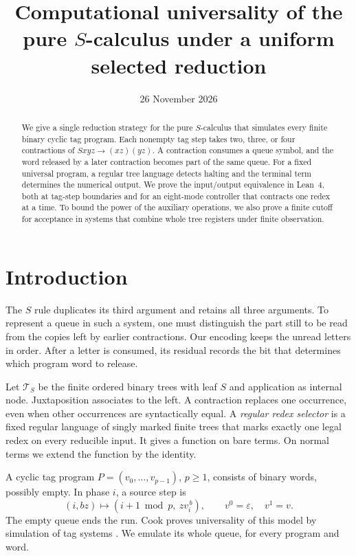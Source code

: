 \documentclass[11pt,letterpaper,oneside,reqno]{amsart}
\title[Selected reduction in the pure \(S\)-calculus]
  {Computational universality of the pure \(S\)-calculus under a uniform selected reduction}
\author{\PaperAuthors}
\date{26 November 2026}
\newcommand{\T}{\mathcal T_S}
\newcommand{\eps}{\varepsilon}
\begin{document}
\begin{abstract}
We give a single reduction strategy for the pure \(S\)-calculus that simulates every finite binary cyclic tag program. Each nonempty tag step takes two, three, or four contractions of \(Sxyz\to(xz)(yz)\). A contraction consumes a queue symbol, and the word released by a later contraction becomes part of the same queue. For a fixed universal program, a regular tree language detects halting and the terminal term determines the numerical output. We prove the input/output equivalence in Lean~4, both at tag-step boundaries and for an eight-mode controller that contracts one redex at a time. To bound the power of the auxiliary operations, we also prove a finite cutoff for acceptance in systems that combine whole tree registers under finite observation.
\end{abstract}
\maketitle

\section{Introduction}
The \(S\) rule duplicates its third argument and retains all three arguments. To represent a queue in such a system, one must distinguish the part still to be read from the copies left by earlier contractions. Our encoding keeps the unread letters in order. After a letter is consumed, its residual records the bit that determines which program word to release.

Let \(\T\) be the finite ordered binary trees with leaf \(S\) and application as internal node. Juxtaposition associates to the left. A contraction replaces one occurrence, even when other occurrences are syntactically equal. A \emph{regular redex selector} is a fixed regular language of singly marked finite trees that marks exactly one legal redex on every reducible input. It gives a function on bare terms. On normal terms we extend the function by the identity.

A cyclic tag program \(P=(v_0,\ldots,v_{p-1})\), \(p\ge1\), consists of binary words, possibly empty. In phase \(i\), a source step is
\begin{equation}
  (i,bz)\longmapsto(i+1\bmod p,\ z v_i^{\,b}),\qquad
  v^0=\eps,\quad v^1=v.                                      \label{cts}
\end{equation}
The empty queue ends the run. Cook proves universality of this model by simulation of tag systems \cite{cook}. We emulate its whole queue, for every program and word.
\end{document}
